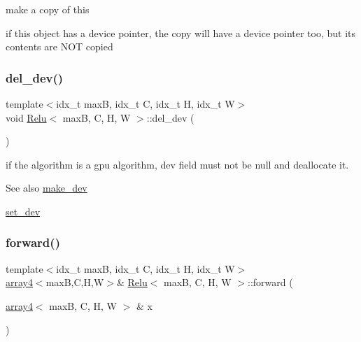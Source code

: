 make a copy of this 

if this object has a device pointer, the copy will have a device pointer too, but its contents are N\+OT copied \mbox{\label{structRelu_a449f220c5cd23217aa463f68a8a4933a}} 
\subsubsection{\texorpdfstring{del\+\_\+dev()}{del\_dev()}}
{\footnotesize\ttfamily template$<$idx\+\_\+t maxB, idx\+\_\+t C, idx\+\_\+t H, idx\+\_\+t W$>$ \\
void \hyperlink{structRelu}{Relu}$<$ maxB, C, H, W $>$\+::del\+\_\+dev (\begin{DoxyParamCaption}{ }\end{DoxyParamCaption})\hspace{0.3cm}{\ttfamily [inline]}}



if the algorithm is a gpu algorithm, dev field must not be null and deallocate it. 

\begin{DoxySeeAlso}{See also}
\hyperlink{structRelu_a0109665896b86defceb3b7b5f4869075}{make\+\_\+dev} 

\hyperlink{structRelu_a4e32ca92b471641ee2d5c1a252bab167}{set\+\_\+dev} 
\end{DoxySeeAlso}
\mbox{\label{structRelu_a71f8322b10508a210025151ad788226f}} 
\subsubsection{\texorpdfstring{forward()}{forward()}}
{\footnotesize\ttfamily template$<$idx\+\_\+t maxB, idx\+\_\+t C, idx\+\_\+t H, idx\+\_\+t W$>$ \\
\hyperlink{structarray4}{array4}$<$maxB,C,H,W$>$\& \hyperlink{structRelu}{Relu}$<$ maxB, C, H, W $>$\+::forward (\begin{DoxyParamCaption}\item[{\hyperlink{structarray4}{array4}$<$ maxB, C, H, W $>$ \&}]{x }\end{DoxyParamCaption})\hspace{0.3cm}{\ttfamily [inline]}}




